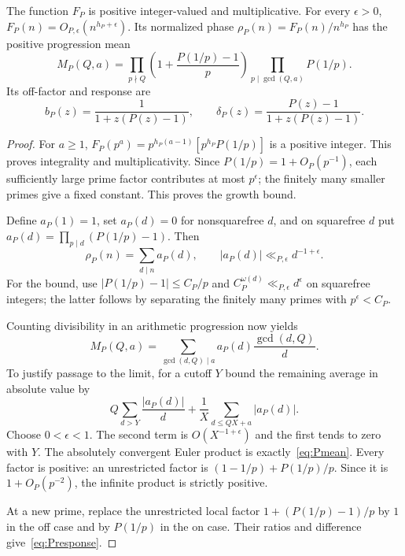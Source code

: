 \begin{lemma}
\label{lem:Pmeans}
The function $F_P$ is positive integer-valued and multiplicative.
For every $\epsilon>0$,
$F_P(n)=O_{P,\epsilon}(n^{h_P+\epsilon})$. Its normalized phase
$\rho_P(n)=F_P(n)/n^{h_P}$ has the positive progression mean
\begin{equation}\label{eq:Pmean}
 M_P(Q,a)=
 \prod_{p\nmid Q}\left(1+\frac{P(1/p)-1}{p}\right)
 \prod_{p\mid\gcd(Q,a)}P(1/p).
\end{equation}
Its off-factor and response are
\begin{equation}\label{eq:Presponse}
 b_P(z)=\frac1{1+z(P(z)-1)},\qquad
 \delta_P(z)=\frac{P(z)-1}{1+z(P(z)-1)}.
\end{equation}
\end{lemma}
\begin{proof}
For $a\geq1$,
$F_P(p^a)=p^{h_P(a-1)}[p^{h_P}P(1/p)]$ is a positive integer.
This proves integrality and multiplicativity. Since
$P(1/p)=1+O_P(p^{-1})$, each sufficiently large prime factor
contributes at most $p^\epsilon$; the finitely many smaller primes
give a fixed constant. This proves the growth bound.

Define $a_P(1)=1$, set $a_P(d)=0$ for nonsquarefree $d$, and on
squarefree $d$ put
$a_P(d)=\prod_{p\mid d}(P(1/p)-1)$. Then
\[
 \rho_P(n)=\sum_{d\mid n}a_P(d),\qquad
 |a_P(d)|\ll_{P,\epsilon}d^{-1+\epsilon}.
\]
For the bound, use $|P(1/p)-1|\leq C_P/p$ and
$C_P^{\omega(d)}\ll_{P,\epsilon}d^\epsilon$ on squarefree integers;
the latter follows by separating the finitely many primes with
$p^\epsilon<C_P$.

Counting divisibility in an arithmetic progression now yields
\[
 M_P(Q,a)=\sum_{\gcd(d,Q)\mid a}
              a_P(d)\frac{\gcd(d,Q)}d.
\]
To justify passage to the limit, for a cutoff $Y$ bound the remaining
average in absolute value by
\[
 Q\sum_{d>Y}\frac{|a_P(d)|}{d}
       +\frac1X\sum_{d\leq QX+a}|a_P(d)|.
\]
Choose $0<\epsilon<1$. The second term is $O(X^{-1+\epsilon})$
and the first tends to zero with $Y$. The absolutely convergent
Euler product is exactly~\eqref{eq:Pmean}. Every factor is positive:
an unrestricted factor is $(1-1/p)+P(1/p)/p$. Since it is
$1+O_P(p^{-2})$, the infinite product is strictly positive.

At a new prime, replace the unrestricted local factor
$1+(P(1/p)-1)/p$ by $1$ in the off case and by $P(1/p)$ in the
on case. Their ratios and difference give~\eqref{eq:Presponse}.
\end{proof}

